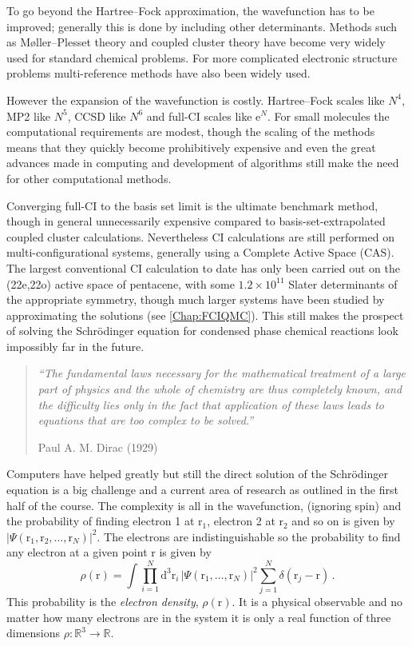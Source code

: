 \documentclass{article}
\theoremstyle{plain}\theoremheaderfont{\normalfont\itshape}\theorembodyfont{\rmfamily}\theoremseparator{.}\newtheorem*{rem}{Remark}\newtheorem*{ex}{Example}\newtheorem*{proof}{Proof}\newtheorem*{altp}{Alternative proof}
\theoremstyle{plain}\theoremheaderfont{\normalfont\bfseries}\theorembodyfont{\rmfamily}\theoremseparator{.}\newtheorem{thm}{Theorem}[section]\newtheorem{lem}[thm]{Lemma}\newtheorem{prop}[thm]{Proposition}\newtheorem*{cor}{Corollary}\newtheorem{defn}[thm]{Definition}\newtheorem{clm}[thm]{Claim}\newtheorem{clminproof}{Claim}
\theoremstyle{break}\theoremheaderfont{\normalfont\itshape}\theorembodyfont{\rmfamily}\theoremseparator{.\medskip}\newtheorem*{proofskip}{Proof}\newtheorem*{exs}{Examples}\newtheorem*{rems}{Remarks}
\theoremstyle{break}\theoremheaderfont{\normalfont\bfseries}\theorembodyfont{\rmfamily}\theoremseparator{.\medskip}\newtheorem{lemskip}[thm]{Lemma}\newtheorem{defnskip}[thm]{Definition}\newtheorem{propskip}[thm]{Proposition}\newtheorem{thmskip}[thm]{Theorem}
\numberwithin{equation}{section}
\newcommand{\e}{\mathrm{e}}
\newcommand{\dd}[2][]{\mathrm{d}^{#1} #2\,}
\newcommand{\vb}[1]{\bm{\mathrm{#1}}}
\newcommand{\abs}[1]{\left| #1 \right|}
\begin{document}
    To go beyond the Hartree--Fock approximation, the wavefunction has to be improved; generally this is done by including other determinants. Methods such as M\o ller--Plesset theory and coupled cluster theory have become very widely used for standard chemical problems. For more complicated electronic structure problems multi-reference methods have also been widely used.

    However the expansion of the wavefunction is costly. Hartree--Fock scales like \(N^4\), MP2 like \(N^5\), CCSD like \(N^6\) and full-CI scales like \(\e^N\). For small molecules the computational requirements are modest, though the scaling of the methods means that they quickly become prohibitively expensive and even the great advances made in computing and development of algorithms still make the need for other computational methods.

    Converging full-CI to the basis set limit is the ultimate benchmark method, though in general unnecessarily expensive compared to basis-set-extrapolated coupled cluster calculations. Nevertheless CI calculations are still performed on multi-configurational systems, generally using a Complete Active Space (CAS). The largest conventional CI calculation to date has only been carried out on the (22e,22o) active space of pentacene, with some \(1.2\times 10^{11}\) Slater determinants of the appropriate symmetry, though much larger systems have been studied by approximating the solutions (see \cref{Chap:FCIQMC}). This still makes the prospect of solving the Schr\"{o}dinger equation for condensed phase chemical reactions look impossibly far in the future.

    \begin{quote}
        \textit{``The fundamental laws necessary for the mathematical treatment of a large part of physics and the whole of chemistry are thus completely known, and the difficulty lies only in the fact that application of these laws leads to equations that are too complex to be solved.''}

        \hfill Paul A. M. Dirac (1929)
    \end{quote}

    Computers have helped greatly but still the direct solution of the Schr\"{o}dinger equation is a big challenge and a current area of research as outlined in the first half of the course. The complexity is all in the wavefunction, (ignoring spin) and the probability of finding electron 1 at \(\vb{r}_1\), electron 2 at \(\vb{r}_2\) and so on is given by \(\abs{\Psi(\vb{r}_1,\vb{r}_2,\dots,\vb{r}_N)}^2\). The electrons are indistinguishable so the probability to find any electron at a given point \(\vb{r}\) is given by
    \begin{equation}
        \rho(\vb{r})=\int\prod_{i=1}^{N}\dd[3]{\vb{r}_i}\abs{\Psi(\vb{r}_1,\dots,\vb{r}_N)}^2\sum_{j=1}^{N}\delta(\vb{r}_j-\vb{r})\,.
    \end{equation}
    This probability is the \textit{electron density}, \(\rho(\vb{r})\). It is a physical observable and no matter how many electrons are in the system it is only a real function of three dimensions \(\rho:\mathbb{R}^3\to\mathbb{R}\).
\end{document}
